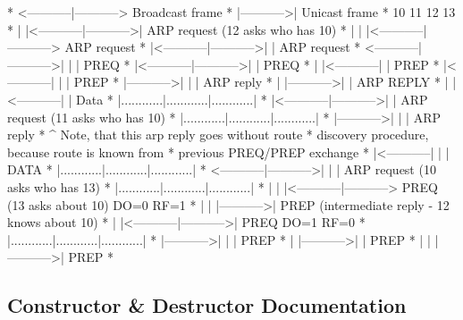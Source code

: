 \begin{DoxyVerb}*  <-----------|----------->   Broadcast frame
*              |----------->|  Unicast frame
*            10          11            12           13
*             |            |<-----------|----------->|             ARP request (12 asks who has 10)
*             |            |            |<-----------|-----------> ARP request
*             |<-----------|----------->|            |             ARP request
* <-----------|----------->|            |            |             PREQ
*             |<-----------|----------->|            |             PREQ
*             |            |<-----------|            |             PREP
*             |<-----------|            |            |             PREP
*             |----------->|            |            |             ARP reply
*             |            |----------->|            |             ARP REPLY
*             |            |<-----------|            |             Data
*             |............|............|............|
*             |<-----------|----------->|            |             ARP request (11 asks who has 10)
*             |............|............|............|
*             |----------->|            |            |             ARP reply
*                  ^ Note, that this arp reply goes without route
*                  discovery procedure, because route is known from
*                  previous PREQ/PREP exchange
*             |<-----------|            |            |             DATA
*             |............|............|............|
* <-----------|----------->|            |            |             ARP request (10 asks who has 13)
*             |............|............|............|
*             |            |            |<-----------|-----------> PREQ (13 asks about 10) DO=0 RF=1
*             |            |            |----------->|             PREP (intermediate reply - 12 knows about 10)
*             |            |<-----------|----------->|             PREQ DO=1 RF=0
*             |............|............|............|
*             |----------->|            |            |             PREP
*             |            |----------->|            |             PREP
*             |            |            |----------->|             PREP
* \end{DoxyVerb}
 

\subsection{Constructor \& Destructor Documentation}

